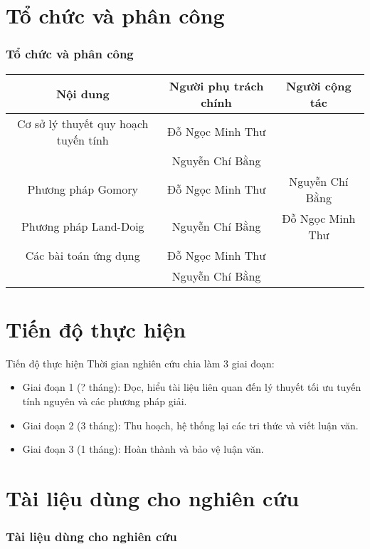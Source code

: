 \documentclass{beamer}
\begin{document}
\section{Tổ chức và phân công}
\begin{frame}[shrink=20]
    \frametitle{Tổ chức và phân công}
    \vspace{2cm}
    \begin{table}
        \begin{tabular}{|c|c|c|}
            \hline
            Nội dung & Người phụ trách chính & Người cộng tác \\
            \hline \hline
            Cơ sở lý thuyết quy hoạch tuyến tính & Đỗ Ngọc Minh Thư & \\
            & Nguyễn Chí Bằng & \\
            \hline
            Phương pháp Gomory & Đỗ Ngọc Minh Thư & Nguyễn Chí Bằng \\
            \hline
            Phương pháp Land-Doig & Nguyễn Chí Bằng & Đỗ Ngọc Minh Thư \\
            \hline
            Các bài toán ứng dụng & Đỗ Ngọc Minh Thư & \\
            & Nguyễn Chí Bằng & \\
            \hline
        \end{tabular}
    \end{table}
\end{frame}
\section{Tiến độ thực hiện}
\begin{frame}{Tiến độ thực hiện}
Thời gian nghiên cứu chia làm 3 giai đoạn:
\begin{itemize}
\item Giai đoạn 1 (? tháng): Đọc, hiểu tài liệu liên quan đến lý thuyết tối ưu tuyến tính nguyên và các phương pháp giải.
\item Giai đoạn 2 (3 tháng): Thu hoạch, hệ thống lại các tri thức và viết luận văn.
\item Giai đoạn 3 (1 tháng): Hoàn thành và bảo vệ luận văn.
\end{itemize}
\end{frame}
\section{Tài liệu dùng cho nghiên cứu}
\begin{frame}[allowframebreaks]
    \frametitle{Tài liệu dùng cho nghiên cứu}
    \tiny{ }
    
\end{frame}
\end{document}
